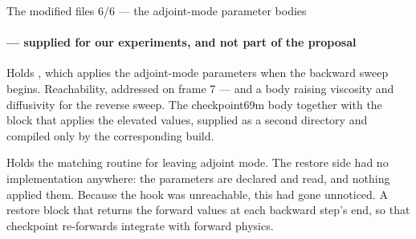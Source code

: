 \begin{frame}{The modified files 6/6 --- the adjoint-mode parameter bodies}
  \framesubtitle{ --- supplied for our experiments, and not part of the proposal}

{Holds , which applies the adjoint-mode
parameters when the backward sweep begins.}
{Reachability, addressed on frame 7 --- and a body raising viscosity and
diffusivity for the reverse sweep.}
{The checkpoint69m body together with the block that applies the elevated
values, supplied as a second  directory and compiled only by the
corresponding build.}

{Holds the matching routine for leaving adjoint mode.}
{The restore side had no implementation anywhere: the parameters are declared
and read, and nothing applied them. Because the hook was unreachable, this had
gone unnoticed.}
{A restore block that returns the forward values at each backward step's end,
so that checkpoint re-forwards integrate with forward physics.}

\end{frame}

